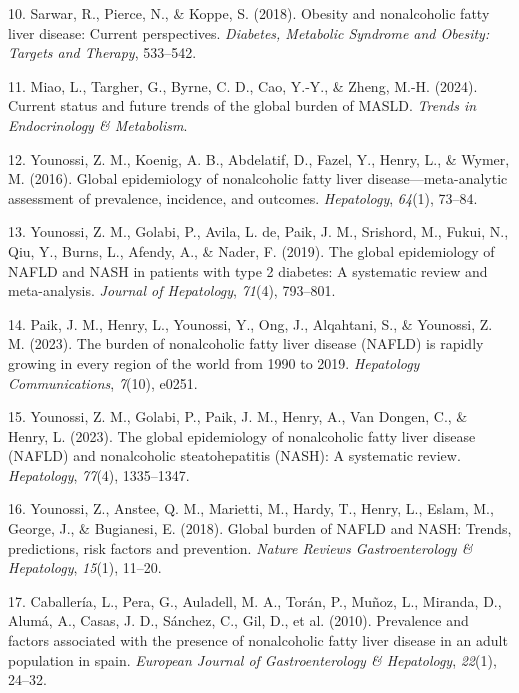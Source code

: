 \documentclass[
  11pt,
  letterpaper,
]{book}
\newlength{\cslhangindent}
\newenvironment{CSLReferences}[2] %
 {\begin{list}{}{%
  \setlength{\itemindent}{0pt}
  \setlength{\leftmargin}{0pt}
  \setlength{\parsep}{0pt}
  \ifodd #1
   \setlength{\leftmargin}{\cslhangindent}
   \setlength{\itemindent}{-1\cslhangindent}
  \fi
  \setlength{\itemsep}{#2\baselineskip}}}
 {\end{list}}
\begin{document}
\begin{CSLReferences}{1}{0}
10. Sarwar, R., Pierce, N., \& Koppe, S. (2018). Obesity and
nonalcoholic fatty liver disease: Current perspectives. \emph{Diabetes,
Metabolic Syndrome and Obesity: Targets and Therapy}, 533--542.

11. Miao, L., Targher, G., Byrne, C. D., Cao, Y.-Y., \& Zheng, M.-H.
(2024). Current status and future trends of the global burden of MASLD.
\emph{Trends in Endocrinology \& Metabolism}.

12. Younossi, Z. M., Koenig, A. B., Abdelatif, D., Fazel, Y., Henry, L.,
\& Wymer, M. (2016). Global epidemiology of nonalcoholic fatty liver
disease---meta-analytic assessment of prevalence, incidence, and
outcomes. \emph{Hepatology}, \emph{64}(1), 73--84.

13. Younossi, Z. M., Golabi, P., Avila, L. de, Paik, J. M., Srishord,
M., Fukui, N., Qiu, Y., Burns, L., Afendy, A., \& Nader, F. (2019). The
global epidemiology of NAFLD and NASH in patients with type 2 diabetes:
A systematic review and meta-analysis. \emph{Journal of Hepatology},
\emph{71}(4), 793--801.

14. Paik, J. M., Henry, L., Younossi, Y., Ong, J., Alqahtani, S., \&
Younossi, Z. M. (2023). The burden of nonalcoholic fatty liver disease
(NAFLD) is rapidly growing in every region of the world from 1990 to
2019. \emph{Hepatology Communications}, \emph{7}(10), e0251.

15. Younossi, Z. M., Golabi, P., Paik, J. M., Henry, A., Van Dongen, C.,
\& Henry, L. (2023). The global epidemiology of nonalcoholic fatty liver
disease (NAFLD) and nonalcoholic steatohepatitis (NASH): A systematic
review. \emph{Hepatology}, \emph{77}(4), 1335--1347.

16. Younossi, Z., Anstee, Q. M., Marietti, M., Hardy, T., Henry, L.,
Eslam, M., George, J., \& Bugianesi, E. (2018). Global burden of NAFLD
and NASH: Trends, predictions, risk factors and prevention. \emph{Nature
Reviews Gastroenterology \& Hepatology}, \emph{15}(1), 11--20.

17. Caballería, L., Pera, G., Auladell, M. A., Torán, P., Muñoz, L.,
Miranda, D., Alumá, A., Casas, J. D., Sánchez, C., Gil, D., et al.
(2010). Prevalence and factors associated with the presence of
nonalcoholic fatty liver disease in an adult population in spain.
\emph{European Journal of Gastroenterology \& Hepatology}, \emph{22}(1),
24--32.


\end{CSLReferences}
\end{document}
